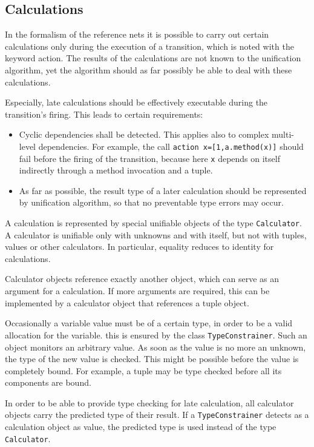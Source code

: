 \subsection{Calculations}

In the formalism of the reference nets it is possible to carry out 
certain calculations only during the execution of a transition, 
which is noted with the keyword action. The results of the 
calculations are not known to the unification algorithm, 
yet the algorithm should as far possibly be able to deal with these 
calculations. 

Especially, late calculations should be effectively executable
during the transition's firing. This leads to certain requirements:
\begin{itemize}
\item Cyclic dependencies shall be detected. This applies also to 
complex multi-level dependencies. For example, the call
\texttt{action x=[1,a.method(x)]}
should fail before the firing of the transition, 
because here \texttt{x} depends on itself 
indirectly through a method invocation 
and a tuple.

\item As far as possible, the result type of a later calculation should be
represented by unification algorithm, so that no preventable
type errors may occur.
\end{itemize}

A calculation is represented by special unifiable objects
of the type \texttt{Calculator}.
A calculator is unifiable only with unknowns and with itself, 
but not with tuples, values or other calculators. 
In particular, equality reduces to identity for calculations. 

Calculator objects reference exactly another object, which can serve 
as an argument for a calculation. If more arguments are required, 
this can be implemented by a calculator object that references a tuple
object.

Occasionally a variable value must be of a certain type,
in order to be a valid allocation for the variable. 
this is ensured by the class \texttt{TypeConstrainer}. Such an object 
monitors an arbitrary value. As soon as the value is no more 
an unknown, the type of the new value is 
checked. This might be possible before the value is completely 
bound. For example, a tuple may be type checked before all its
components are bound.


In order to be able to provide type checking for late calculation, 
all calculator objects carry the predicted type of their result. 
If a \texttt{TypeConstrainer} detects as a calculation object as value, the 
predicted type is used instead of the type \texttt{Calculator}. 

